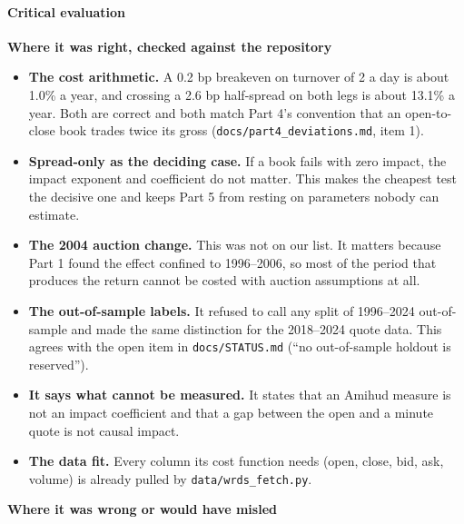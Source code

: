 \hypertarget{critical-evaluation}{%
\paragraph{Critical evaluation}\label{critical-evaluation}}

\textbf{Where it was right, checked against the repository}

\begin{itemize}
\tightlist
\item
  \textbf{The cost arithmetic.} A 0.2 bp breakeven on turnover of 2 a day is about 1.0\% a year,
  and crossing a 2.6 bp half-spread on both legs is about 13.1\% a year. Both are correct
  and both match Part 4's convention that an open-to-close book trades twice its gross
  (\texttt{docs/part4\_deviations.md}, item 1).
\item
  \textbf{Spread-only as the deciding case.} If a book fails with zero impact, the impact
  exponent and coefficient do not matter. This makes the cheapest test the decisive one
  and keeps Part 5 from resting on parameters nobody can estimate.
\item
  \textbf{The 2004 auction change.} This was not on our list. It matters because Part 1 found
  the effect confined to 1996--2006, so most of the period that produces the return
  cannot be costed with auction assumptions at all.
\item
  \textbf{The out-of-sample labels.} It refused to call any split of 1996--2024 out-of-sample and
  made the same distinction for the 2018--2024 quote data. This agrees with the open item in
  \texttt{docs/STATUS.md} (``no out-of-sample holdout is reserved'').
\item
  \textbf{It says what cannot be measured.} It states that an Amihud measure is not an impact
  coefficient and that a gap between the open and a minute quote is not causal impact.
\item
  \textbf{The data fit.} Every column its cost function needs (open, close, bid, ask, volume) is
  already pulled by \texttt{data/wrds\_fetch.py}.
\end{itemize}

\textbf{Where it was wrong or would have misled}

